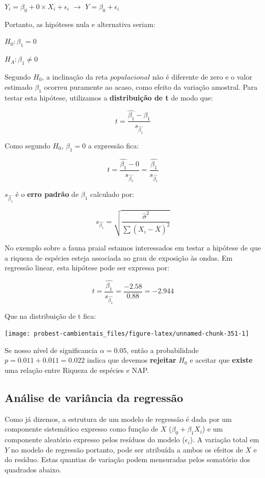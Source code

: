 \documentclass[
]{book}
\begin{document}
\(Y_i = \beta_0 + 0 \times X_i + \epsilon_i\) \(\rightarrow\) \(Y = \beta_0 + \epsilon_i\)

Portanto, as hipóteses nula e alternativa seriam:

\(H_0: \beta_1 = 0\)

\(H_A: \beta_1 \ne 0\)

Segundo \(H_0\), a inclinação da reta \(populacional\) não é diferente de zero e o valor estimado \(\hat{\beta_1}\) ocorreu puramente ao acaso, como efeito da variação amostral. Para testar esta hipótese, utilizamos a \textbf{distribuição de t} de modo que:

\[t = \frac{\hat{\beta_1} - \beta_1}{s_{\hat{\beta_1}}}\]

Como segundo \(H_0\), \(\beta_1 = 0\) a expressão fica:

\[t = \frac{\hat{\beta_1} - 0}{s_{\hat{\beta_1}}} = \frac{\hat{\beta_1}}{s_{\hat{\beta_1}}}\]

\(s_{\hat{\beta_1}}\) é o \textbf{erro padrão} de \(\beta_1\) calculado por:

\[s_{\hat{\beta_1}} = \sqrt{\frac{\hat{\sigma}^2}{\sum{(X_i-\overline{X})^2}}}\]

No exemplo sobre a fauna praial estamos interessados em testar a hipótese de que a riqueza de espécies esteja associada ao grau de exposição às ondas. Em regressão linear, esta hipótese pode ser expressa por:

\[t = \frac{\hat{\beta_1}}{s_{\hat{\beta_1}}} = \frac{-2.58}{0.88} = -2.944\]

Que na distribuição de t fica:

\begin{center}\texttt{[image: probest-cambientais\_files/figure-latex/unnamed-chunk-351-1]} \end{center}

Se nosso nível de significancia \(\alpha = 0.05\), então a probabilidade \(p = 0.011 + 0.011 = 0.022\) indica que devemos \textbf{rejeitar} \(H_0\) e aceitar que \textbf{existe} uma relação entre Riqueza de espécies e NAP.

\hypertarget{anuxe1lise-de-variuxe2ncia-da-regressuxe3o}{%
\subsection{Análise de variância da regressão}\label{anuxe1lise-de-variuxe2ncia-da-regressuxe3o}}

Como já dizemos, a estrutura de um modelo de regressão é dada por um componente sistemático expresso como função de \(X\) (\(\beta_0 + \beta_1X_i\)) e um componente aleatório expresso pelos resíduos do modelo (\(\epsilon_i\)). A variação total em \(Y\) no modelo de regressão portanto, pode ser atribuída a ambos os efeitos de \(X\) e do resíduo. Estas quantias de variação podem mensuradas pelos somatório dos quadrados abaixo.
\end{document}

